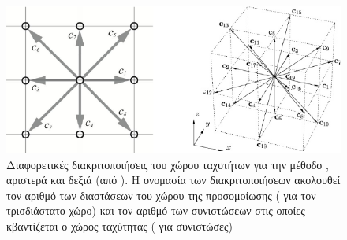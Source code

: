 \begin{figure}[]
  \centering
  \includegraphics[width=\textwidth]{figures/lb-lattices-2.pdf}
  \caption[Διακριτοποίηση χώρου κατάστασης ] {Διαφορετικές διακριτοποιήσεις του
    χώρου ταχυτήτων για την μέθοδο , αριστερά  και δεξιά 
    (από  \cite{duchateau2015}). Η ονομασία των διακριτοποιήσεων
    ακολουθεί τον αριθμό των διαστάσεων του χώρου της προσομοίωσης ( για τον
    τρισδιάστατο χώρο) και τον αριθμό των συνιστώσεων στις οποίες κβαντίζεται ο χώρος
    ταχύτητας ( για  συνιστώσες)}
  \label{fig:lb-lattices}
\end{figure}

